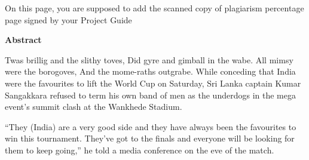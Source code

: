 \newpage

On this page, you are supposed to add the scanned copy of plagiarism percentage page signed by your Project Guide


\newpage
\begin{center}
\Large \textbf{Abstract}
\end{center}
Twas brillig and the slithy toves, Did gyre and gimball in the wabe.  All mimsy were the borogoves, And the mome-raths outgrabe. While conceding that India were the favourites to lift the World Cup on Saturday, Sri Lanka captain Kumar Sangakkara refused to term his own band of men as the underdogs in the mega event's summit clash at the Wankhede Stadium.

``They (India) are a very good side and they have always been the favourites to win this tournament. They've got to the finals and everyone will be looking for them to keep going,'' he told a media conference on the eve of the match. 

